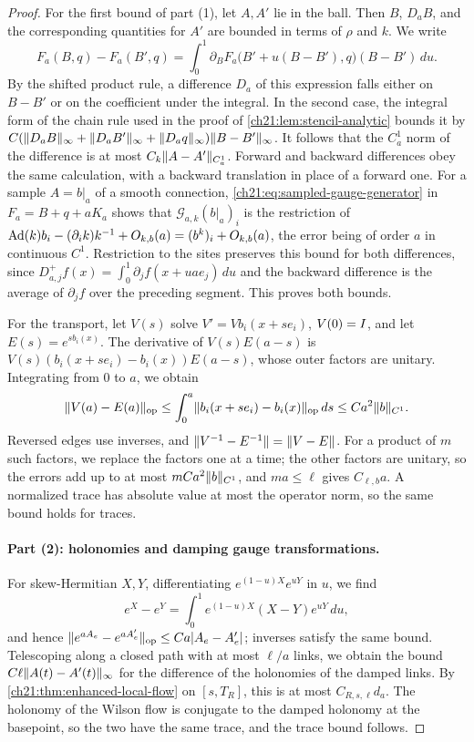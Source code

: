 \begin{proof}
For the first bound of part (1), let $A,A'$ lie in the ball. Then $B$, $D_aB$, and the corresponding quantities for $A'$ are bounded in terms of $\rho$ and $k$. We write
\[
 F_a(B,q)-F_a(B',q)=\int_0^1\partial_BF_a\bigl(B'+u(B-B'),q\bigr)(B-B')\,du .
\]
By the shifted product rule, a difference $D_a$ of this expression falls either on $B-B'$ or on the coefficient under the integral. In the second case, the integral form of the chain rule used in the proof of \cref{ch21:lem:stencil-analytic} bounds it by $C(\lVert D_aB\rVert_\infty+\lVert D_aB'\rVert_\infty+\lVert D_aq\rVert_\infty)\lVert B-B'\rVert_\infty$. It follows that the $C_a^1$ norm of the difference is at most $C_k\lVert A-A'\rVert_{C_a^1}$. Forward and backward differences obey the same calculation, with a backward translation in place of a forward one. For a sample $A=b|_a$ of a smooth connection, \eqref{ch21:eq:sampled-gauge-generator} in $F_a=B+q+aK_a$ shows that $\mathscr G_{a,k}(b|_a)_i$ is the restriction of $\operatorname{Ad}(k)b_i-(\partial_ik)k^{-1}+O_{k,b}(a)=(b^k)_i+O_{k,b}(a)$, the error being of order $a$ in continuous $C^1$. Restriction to the sites preserves this bound for both differences, since $D_{a,j}^+f(x)=\int_0^1\partial_jf(x+uae_j)\,du$ and the backward difference is the average of $\partial_jf$ over the preceding segment. This proves both bounds.

For the transport, let $V(s)$ solve $V'=Vb_i(x+se_i)$, $V(0)=I$, and let $E(s)=e^{sb_i(x)}$. The derivative of $V(s)E(a-s)$ is $V(s)(b_i(x+se_i)-b_i(x))E(a-s)$, whose outer factors are unitary. Integrating from $0$ to $a$, we obtain
\[
 \lVert V(a)-E(a)\rVert_{\mathrm{op}}\le\int_0^a\lVert b_i(x+se_i)-b_i(x)\rVert_{\mathrm{op}}\,ds\le Ca^2\lVert b\rVert_{C^1}.
\]
Reversed edges use inverses, and $\lVert V^{-1}-E^{-1}\rVert=\lVert V-E\rVert$. For a product of $m$ such factors, we replace the factors one at a time; the other factors are unitary, so the errors add up to at most $mCa^2\lVert b\rVert_{C^1}$, and $ma\le\ell$ gives $C_{\ell,b}a$. A normalized trace has absolute value at most the operator norm, so the same bound holds for traces.

\paragraph{Part (2): holonomies and damping gauge transformations.}
For skew-Hermitian $X,Y$, differentiating $e^{(1-u)X}e^{uY}$ in $u$, we find
\[
 e^X-e^Y=\int_0^1e^{(1-u)X}(X-Y)e^{uY}\,du,
\]
and hence $\lVert e^{aA_e}-e^{aA'_e}\rVert_{\mathrm{op}}\le Ca\lvert A_e-A'_e\rvert$; inverses satisfy the same bound. Telescoping along a closed path with at most $\ell/a$ links, we obtain the bound $C\ell\lVert A(t)-A'(t)\rVert_\infty$ for the difference of the holonomies of the damped links. By \cref{ch21:thm:enhanced-local-flow} on $[s,T_R]$, this is at most $C_{R,s,\ell}d_a$. The holonomy of the Wilson flow is conjugate to the damped holonomy at the basepoint, so the two have the same trace, and the trace bound follows.


\end{proof}
